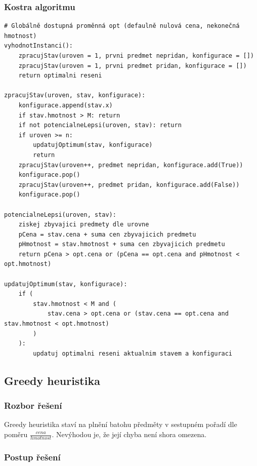 \documentclass[12pt]{article}
\begin{document}
\subsubsection{Kostra algoritmu}
\begin{listing}[ht]
    \begin{verbatim}
# Globálně dostupná proměnná opt (defaulně nulová cena, nekonečná hmotnost)
vyhodnotInstanci():
    zpracujStav(uroven = 1, prvni predmet nepridan, konfigurace = [])
    zpracujStav(uroven = 1, prvni predmet pridan, konfigurace = []) 
    return optimalni reseni
 
zpracujStav(uroven, stav, konfigurace): 
    konfigurace.append(stav.x)
    if stav.hmotnost > M: return
    if not potencialneLepsi(uroven, stav): return
    if uroven >= n: 
        updatujOptimum(stav, konfigurace) 
        return 
    zpracujStav(uroven++, predmet nepridan, konfigurace.add(True))
    konfigurace.pop()
    zpracujStav(uroven++, predmet pridan, konfigurace.add(False))
    konfigurace.pop()

potencialneLepsi(uroven, stav):
    ziskej zbyvajici predmety dle urovne
    pCena = stav.cena + suma cen zbyvajicich predmetu
    pHmotnost = stav.hmotnost + suma cen zbyvajicich predmetu
    return pCena > opt.cena or (pCena == opt.cena and pHmotnost < opt.hmotnost)

updatujOptimum(stav, konfigurace): 
    if (
        stav.hmotnost < M and (
            stav.cena > opt.cena or (stav.cena == opt.cena and stav.hmotnost < opt.hmotnost)
        )
    ):
        updatuj optimalni reseni aktualnim stavem a konfiguraci
    \end{verbatim}
\end{listing}

\newpage

\subsection{Greedy heuristika}

\subsubsection{Rozbor řešení}

Greedy heuristika staví na plnění batohu předměty v sestupném pořadí dle poměru \(\frac{cena}{hmotnost}\). Nevýhodou je, že její chyba není shora omezena.

\subsubsection{Postup řešení}
\end{document}

